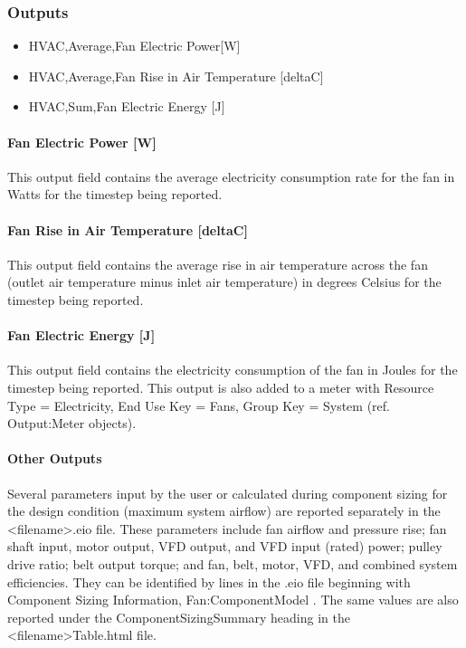 \subsubsection{Outputs}\label{outputs-4-005}

\begin{itemize}
\item
  HVAC,Average,Fan Electric Power{[}W{]}
\item
  HVAC,Average,Fan Rise in Air Temperature {[}deltaC{]}
\item
  HVAC,Sum,Fan Electric Energy {[}J{]}
\end{itemize}

\paragraph{Fan Electric Power {[}W{]}}\label{fan-electric-power-w-4}

This output field contains the average electricity consumption rate for the fan in Watts for the timestep being reported.

\paragraph{Fan Rise in Air Temperature {[}deltaC{]}}\label{fan-rise-in-air-temperature-deltac-4}

This output field contains the average rise in air temperature across the fan (outlet air temperature minus inlet air temperature) in degrees Celsius for the timestep being reported.

\paragraph{Fan Electric Energy {[}J{]}}\label{fan-electric-energy-j-4}

This output field contains the electricity consumption of the fan in Joules for the timestep being reported. This output is also added to a meter with Resource Type = Electricity, End Use Key = Fans, Group Key = System (ref. Output:Meter objects).

\paragraph{Other Outputs}\label{other-outputs}

Several parameters input by the user or calculated during component sizing for the design condition (maximum system airflow) are reported separately in the \textless{}filename\textgreater{}.eio file. These parameters include fan airflow and pressure rise; fan shaft input, motor output, VFD output, and VFD input (rated) power; pulley drive ratio; belt output torque; and fan, belt, motor, VFD, and combined system efficiencies. They can be identified by lines in the .eio file beginning with Component Sizing Information, Fan:ComponentModel . The same values are also reported under the ComponentSizingSummary heading in the \textless{}filename\textgreater{}Table.html file.
